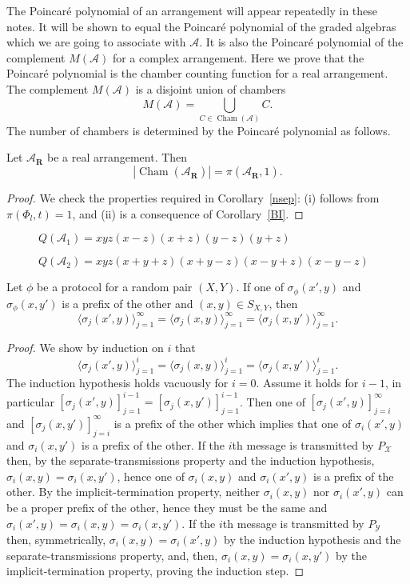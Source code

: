 \documentclass[mlq,fleqn]{w-art}
\newcommand{\A}{\mathcal{A}}
\newcommand{\st}{\sigma}
\newcommand{\XcY}{{(X,Y)}}
\newcommand{\SXY}{{S_{X,Y}}}
\newcommand{\PY}{{P_{\mathcal{Y}}}}
\newcommand{\X}{\mathcal{X}}
\DeclareMathOperator{\Cham}{Cham}
\newcommand{\envert}[1]{\left\lvert#1\right\rvert}
\let\abs=\envert
\begin{document}
The Poincar\'e polynomial of an arrangement
will appear repeatedly
in these notes. It will be shown to equal the
Poincar\'e polynomial
of the graded algebras which we are going to
associate with $\A$. It is also the Poincar\'e
polynomial of the complement $M(\A)$ for a
complex arrangement. Here we prove
that the Poincar\'e polynomial is the chamber
counting function for a real arrangement. The
complement $M(\A)$ is a disjoint union of chambers
\[M(\A) = \bigcup_{C \in \Cham(\A)} C.\]
The number
of chambers is determined by the Poincar\'e
polynomial as follows.

\begin{thm}\label{th-realarr}
Let $\A_{\mathbf{R}}$ be a real arrangement. Then
\[ \abs{\Cham(\A_{\mathbf{R}})} = \pi (\A_{\mathbf{R}},1). \]
\end{thm}

\begin{proof}
We check the properties required in Corollary~\ref{nsep}:
(i) follows from $\pi (\Phi_{ l},t) = 1$, and (ii) is a
consequence of Corollary~\ref{BI}.
\end{proof}

\begin{figure}
\vspace{5cm}
\caption[]{$Q(\A_{1}) = xyz(x-z)(x+z)(y-z)(y+z)$}
\end{figure}

\begin{figure}
\vspace{5cm}
\caption[]{$Q(\A_{2})= xyz(x+y+z)(x+y-z)(x-y+z)(x-y-z)$}
\end{figure}

\begin{thm}
\label{T_first_the_int}
Let $\phi$ be a protocol for a random pair $\XcY$.
If one of $\st_\phi(x',y)$ and $\st_\phi(x,y')$ is a prefix of the other
and $(x,y)\in\SXY$, then
\[
\langle \st_j(x',y)\rangle_{j=1}^\infty
=\langle \st_j(x,y)\rangle_{j=1}^\infty
=\langle \st_j(x,y')\rangle_{j=1}^\infty .
\]
\end{thm}
\begin{proof}
We show by induction on $i$ that
\[
\langle \st_j(x',y)\rangle_{j=1}^i
=\langle \st_j(x,y)\rangle_{j=1}^i
=\langle \st_j(x,y')\rangle_{j=1}^i.
\]
The induction hypothesis holds vacuously for $i=0$. Assume it holds for
$i-1$, in particular
$[\st_j(x',y)]_{j=1}^{i-1}=[\st_j(x,y')]_{j=1}^{i-1}$. Then one of
$[\st_j(x',y)]_{j=i}^{\infty}$ and $[\st_j(x,y')]_{j=i}^{\infty}$ is a
prefix of the other which implies that one of $\st_i(x',y)$ and
$\st_i(x,y')$ is a prefix of the other. If the $i$th message is
transmitted by $P_\X$ then, by the separate-transmissions property and
the induction hypothesis, $\st_i(x,y)=\st_i(x,y')$, hence one of
$\st_i(x,y)$ and $\st_i(x',y)$ is a prefix of the other. By the
implicit-termination property, neither $\st_i(x,y)$ nor $\st_i(x',y)$
can be a proper prefix of the other, hence they must be the same and
$\st_i(x',y)=\st_i(x,y)=\st_i(x,y')$. If the $i$th message is
transmitted by $\PY$ then, symmetrically, $\st_i(x,y)=\st_i(x',y)$ by
the induction hypothesis and the separate-transmissions property, and,
then, $\st_i(x,y)=\st_i(x,y')$ by the implicit-termination property,
proving the induction step.
\end{proof}
\end{document}
